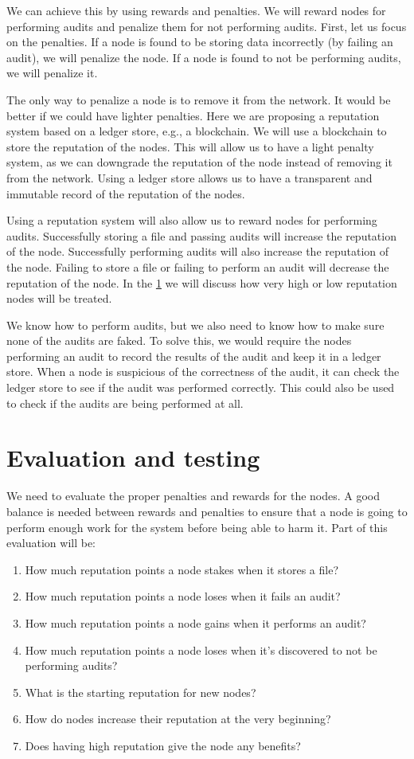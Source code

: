 We can achieve this by using rewards and penalties.
We will reward nodes for performing audits and penalize them for not performing audits.
First, let us focus on the penalties.
If a node is found to be storing data incorrectly (by failing an audit), we will penalize the node.
If a node is found to not be performing audits, we will penalize it.

The only way to penalize a node is to remove it from the network.
It would be better if we could have lighter penalties.
Here we are proposing a reputation system based on a ledger store, e.g., a blockchain.
We will use a blockchain to store the reputation of the nodes.
This will allow us to have a light penalty system, as we can downgrade the reputation of the node
instead of removing it from the network.
Using a ledger store allows us to have a transparent and immutable record of the reputation of the nodes.

Using a reputation system will also allow us to reward nodes for performing audits.
Successfully storing a file and passing audits will increase the reputation of the node.
Successfully performing audits will also increase the reputation of the node.
Failing to store a file or failing to perform an audit will decrease the reputation of the node.
In the \ref{section:evaluation} we will discuss how very high or low reputation nodes will be treated.

We know how to perform audits, but we also need to know how to make sure none of the
audits are faked.
To solve this, we would require the nodes performing an audit to record the results of the audit and keep
it in a ledger store.
When a node is suspicious of the correctness of the audit, it can check the ledger store to see if the audit
was performed correctly.
This could also be used to check if the audits are being performed at all.

\section{Evaluation and testing}
\label{section:evaluation}

We need to evaluate the proper penalties and rewards for the nodes.
A good balance is needed between rewards and penalties to ensure that a node is
going to perform enough work for the system before being able to harm it.
Part of this evaluation will be:
\begin{enumerate}
    \item How much reputation points a node stakes when it stores a file?
    \item How much reputation points a node loses when it fails an audit?
    \item How much reputation points a node gains when it performs an audit?
    \item How much reputation points a node loses when it's discovered to not be performing audits?
    \item What is the starting reputation for new nodes?
    \item How do nodes increase their reputation at the very beginning?
    \item Does having high reputation give the node any benefits?
\end{enumerate}

